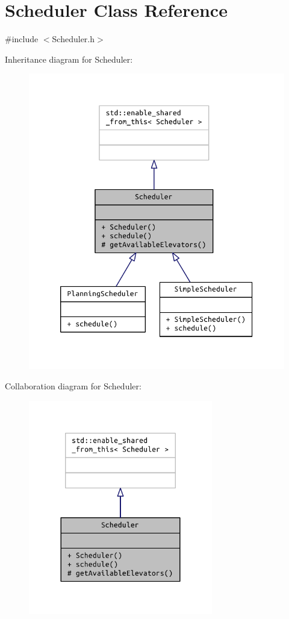 \hypertarget{class_scheduler}{}\section{Scheduler Class Reference}
\label{class_scheduler}


{\ttfamily \#include $<$Scheduler.\+h$>$}



Inheritance diagram for Scheduler\+:
\nopagebreak
\begin{figure}[H]
\begin{center}
\leavevmode
\includegraphics[width=320pt]{class_scheduler__inherit__graph}
\end{center}
\end{figure}


Collaboration diagram for Scheduler\+:
\nopagebreak
\begin{figure}[H]
\begin{center}
\leavevmode
\includegraphics[width=228pt]{class_scheduler__coll__graph}
\end{center}
\end{figure}
